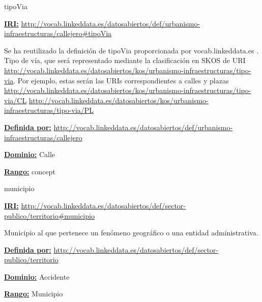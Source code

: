 \begin{mybox}{tipoVia}
\begin{flushleft}
\underline{\textbf{IRI:}}
\url{http://vocab.linkeddata.es/datosabiertos/def/urbanismo-infraestructuras/callejero#tipoVia}
\newline

Se ha reutilizado la definición de tipoVia proporcionada por vocab.linkeddata.es \cite{datoabiertos_tipoVia}.
Tipo de vía, que será representado mediante la clasificación en SKOS de URI \url{http://vocab.linkeddata.es/datosabiertos/kos/urbanismo-infraestructuras/tipo-via}. Por ejemplo, estas serán las URIs correspondientes a calles y plazas \url{http://vocab.linkeddata.es/datosabiertos/kos/urbanismo-infraestructuras/tipo-via/CL} \url{http://vocab.linkeddata.es/datosabiertos/kos/urbanismo-infraestructuras/tipo-via/PL}
\newline

\underline{\textbf{Definida por:}}
\url{http://vocab.linkeddata.es/datosabiertos/def/urbanismo-infraestructuras/callejero}
\newline

\underline{\textbf{Dominio:}}
		Calle
\newline

\underline{\textbf{Rango:}}
		concept

\end{flushleft}
\end{mybox}






\begin{mybox}{municipio}
\begin{flushleft}
\underline{\textbf{IRI:}}
\url{http://vocab.linkeddata.es/datosabiertos/def/sector-publico/territorio#municipio}
\newline

Municipio al que pertenece un fenómeno geográfico o una entidad administrativa.
\newline

\underline{\textbf{Definida por:}}
\url{http://vocab.linkeddata.es/datosabiertos/def/sector-publico/territorio}
\newline

\underline{\textbf{Dominio:}}
		Accidente
\newline

\underline{\textbf{Rango:}}
		Municipio

\end{flushleft}
\end{mybox}




